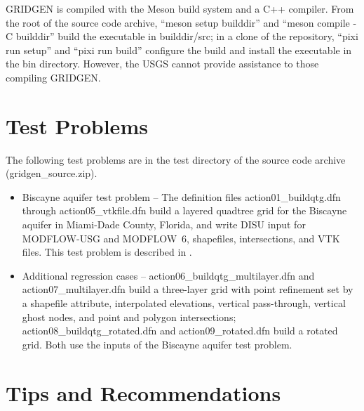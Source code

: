\documentclass[11pt,twoside,twocolumn]{usgsreport}
\begin{document}
GRIDGEN is compiled with the Meson build system and a C++ compiler. From the root of the source code archive, ``meson setup builddir'' and ``meson compile -C builddir'' build the executable in builddir/src; in a clone of the repository, ``pixi run setup'' and ``pixi run build'' configure the build and install the executable in the bin directory. However, the USGS cannot provide assistance to those compiling GRIDGEN.

\section{Test Problems}

The following test problems are in the test directory of the source code archive (gridgen\_source.zip).

\begin{itemize}
  \item Biscayne aquifer test problem -- The definition files action01\_buildqtg.dfn through action05\_vtkfile.dfn build a layered quadtree grid for the Biscayne aquifer in Miami-Dade County, Florida, and write DISU input for MODFLOW-USG and MODFLOW~6, shapefiles, intersections, and VTK files. This test problem is described in \citet{lien2015gridgen}.
  \item Additional regression cases -- action06\_buildqtg\_multilayer.dfn and action07\_multilayer.dfn build a three-layer grid with point refinement set by a shapefile attribute, interpolated elevations, vertical pass-through, vertical ghost nodes, and point and polygon intersections; action08\_buildqtg\_rotated.dfn and action09\_rotated.dfn build a rotated grid. Both use the inputs of the Biscayne aquifer test problem.
\end{itemize}

\section{Tips and Recommendations}
\end{document}
